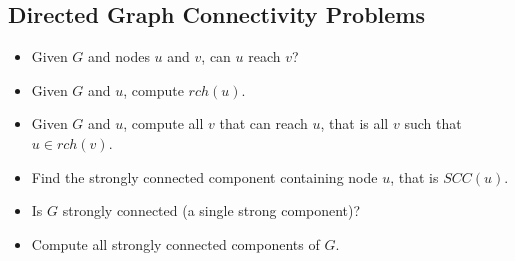 \documentclass[12pt]{article}
\begin{document}
\subsection{Directed Graph Connectivity Problems}
\begin{itemize}
    \item Given $G$ and nodes $u$ and $v$, can $u$ reach $v$?
    \item Given $G$ and $u$, compute $rch(u)$.
    \item Given $G$ and $u$, compute all $v$ that can reach $u$, that is all $v$ such that $u \in rch(v)$.
    \item Find the strongly connected component containing node $u$, that is $SCC(u)$.
    \item Is $G$ strongly connected (a single strong component)?
    \item Compute all strongly connected components of $G$.
\end{itemize}
\end{document}
